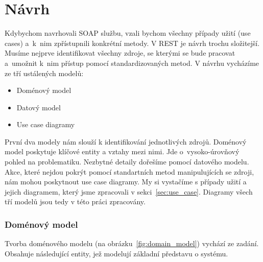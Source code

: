 \chapter{Návrh}

Kdybychom navrhovali SOAP službu, vzali bychom všechny případy užití (use cases) a~k~nim zpřístupnili
konkrétní metody. V REST je návrh trochu složitejší.
Musíme nejprve identifikovat všechny zdroje, se kterými se bude pracovat a~umožnit
k~nim přístup pomocí standardizovaných metod. V návrhu vycházíme ze tří ustálených modelů:

\begin{itemize}
\item Doménový model
\item Datový model
\item Use case diagramy
\end{itemize}

První dva modely nám slouží k identifikování jednotlivých zdrojů.
Doménový model poskytuje klíčové entity a vztahy mezi nimi.
Jde o~vysoko-úrovňový pohled na problematiku. Nezbytné detaily dořešíme pomocí datového modelu. 
Akce, které nejdou pokrýt pomocí standartních metod manipulujících se zdroji, nám mohou poskytnout use case diagramy.
My si vystačíme s případy užití a jejich diagramem, který jsme zpracovali v sekci~\ref{sec:use_case}. 
Diagramy všech tří modelů jsou tedy v této práci zpracovány.

\subsection{Doménový model}

Tvorba doménového modelu (na obrázku~\ref{fig:domain_model}) vychází ze zadání. Obsahuje následující entity,
jež modelují základní představu o systému.

